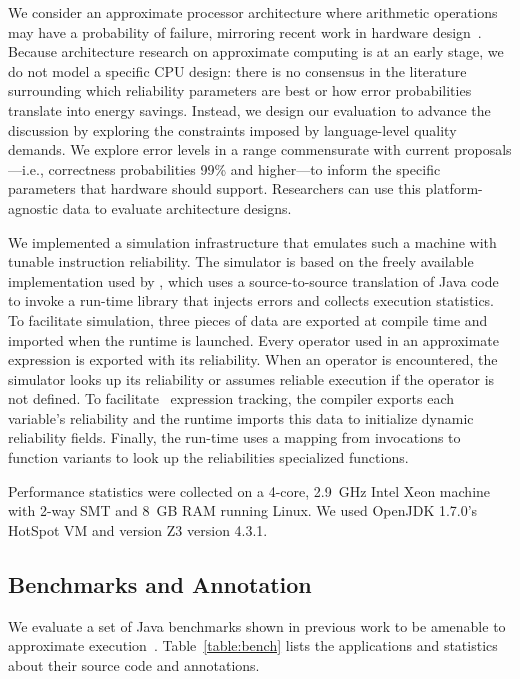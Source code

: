 \documentclass[10pt,nocopyrightspace,preprint]{sigplanconf}
\begin{document}
We consider an approximate processor architecture where arithmetic
operations may have a probability of failure, mirroring recent work in
hardware design~\cite{truffle, quora, kim-hpca, uva-adder}.
Because architecture research on approximate computing is at an early stage,
we do not model a specific CPU design: there is no consensus in the literature
surrounding which reliability parameters are best or how error probabilities
translate into energy savings.
Instead, we design our evaluation to advance the discussion by exploring the
constraints imposed by language-level quality demands.
We explore error levels in a range commensurate with current proposals---i.e.,
correctness probabilities 99\% and higher---to inform the specific parameters
that hardware should support.
Researchers can use this platform-agnostic data to evaluate architecture
designs.

We implemented a simulation
infrastructure that emulates such a machine with tunable instruction
reliability.  The
simulator is based on the freely available implementation used by
\citet{enerj}, which uses a
source-to-source translation of Java code to invoke a run-time library that
injects errors and collects execution statistics.  To facilitate simulation,
three pieces of data are exported at compile time and imported when the runtime
is launched.  Every operator used in an approximate expression is exported with
its reliability.  When an operator is encountered, the simulator looks up its
reliability or assumes reliable execution if the operator is not defined.
To facilitate \Dyn\ expression tracking, the compiler exports each variable's
reliability and the runtime imports this data to initialize dynamic
reliability fields.
Finally, the run-time uses a mapping from invocations to function
variants to look up the reliabilities specialized functions.

Performance statistics were collected on a 4-core, 2.9~GHz Intel Xeon machine
with 2-way SMT and 8~GB RAM running Linux.
We used OpenJDK 1.7.0's HotSpot VM and version Z3 version 4.3.1.

\subsection{Benchmarks and Annotation}

We evaluate a set of Java benchmarks shown in previous work to be amenable to
approximate execution~\cite{enerj, approxstorage}.
Table~\ref{table:bench} lists the applications and statistics about their
source code and annotations.
\end{document}
